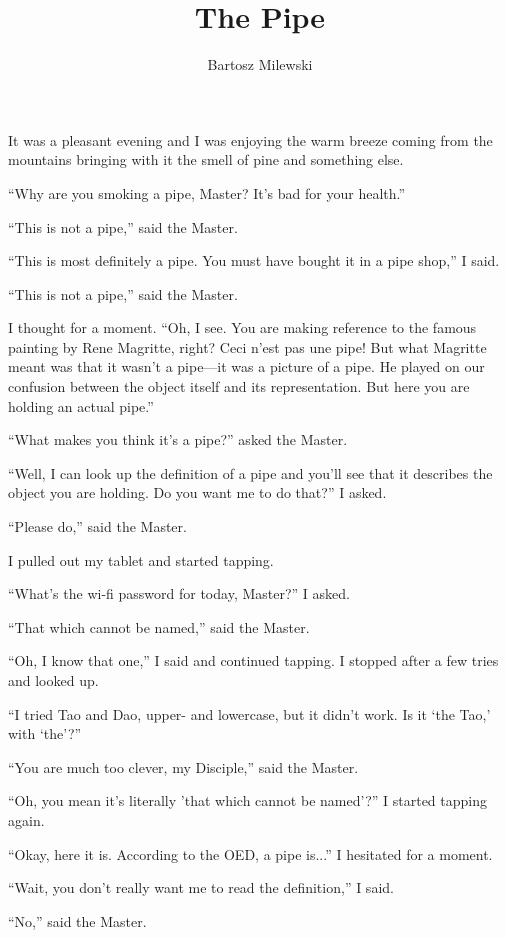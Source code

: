 \documentclass{memoir}
\author{Bartosz Milewski}
\title{The Pipe}
\date{}
\begin{document}
\maketitle{}

It was a pleasant evening and I was enjoying the warm breeze coming from the mountains bringing with it the smell of pine and something else. 

``Why are you smoking a pipe, Master? It's bad for your health.''

``This is not a pipe,'' said the Master.

``This is most definitely a pipe. You must have bought it in a pipe shop,'' I said.

``This is not a pipe,'' said the Master.

I thought for a moment.
``Oh, I see. You are making reference to the famous painting by Rene Magritte, right? Ceci n'est pas une pipe! But what Magritte meant was that it wasn't a pipe---it was a picture of a pipe. He played on our confusion between the object itself and its representation. But here you are holding an actual pipe.''

``What makes you think it's a pipe?'' asked the Master.

``Well, I can look up the definition of a pipe and you'll see that it describes the object you are holding. Do you want me to do that?'' I asked.

``Please do,'' said the Master.

I pulled out my tablet and started tapping.

``What's the wi-fi password for today, Master?'' I asked.

``That which cannot be named,'' said the Master.

``Oh, I know that one,'' I said and continued tapping. I stopped after a few tries and looked up.

``I tried Tao and Dao, upper- and lowercase, but it didn't work. Is it `the Tao,' with `the'?''

``You are much too clever, my Disciple,'' said the Master.

``Oh, you mean it's literally 'that which cannot be named'?'' I started tapping again.

``Okay, here it is. According to the OED, a pipe is...'' I hesitated for a moment.

``Wait, you don't really want me to read the definition,'' I said.

``No,'' said the Master.
\end{document}
